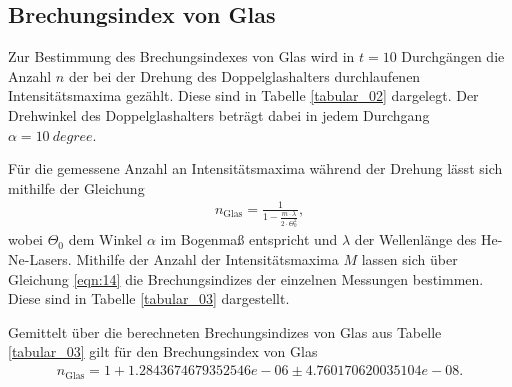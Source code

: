 \subsection{Brechungsindex von Glas}
\noindent Zur Bestimmung des Brechungsindexes von Glas wird in $t = 10$
Durchgängen die Anzahl $n$ der bei der Drehung des Doppelglashalters durchlaufenen
Intensitätsmaxima gezählt. Diese sind in Tabelle \ref{tabular_02} dargelegt.
Der Drehwinkel des Doppelglashalters beträgt dabei in jedem Durchgang $\alpha =
\SI{10}{degree}$. \\
\FloatBarrier

\FloatBarrier
\noindent Für die gemessene Anzahl an Intensitätsmaxima während der Drehung
lässt sich mithilfe der Gleichung
\begin{align}
  n_\text{Glas} = \frac{1}{1 - \frac{m \cdot \lambda}{2 \cdot \Theta_0^2}},
  \label{eqn:14}
\end{align}
\noindent wobei $\Theta_0$ dem Winkel $\alpha$ im Bogenmaß entspricht und
$\lambda$ der Wellenlänge des He-Ne-Lasers. Mithilfe der Anzahl der
Intensitätsmaxima $M$ lassen sich über Gleichung \ref{eqn:14} die
Brechungsindizes der einzelnen Messungen bestimmen. Diese sind in Tabelle
\ref{tabular_03} dargestellt. \\
\FloatBarrier

\FloatBarrier
\noindent Gemittelt über die berechneten Brechungsindizes von Glas aus Tabelle
\ref{tabular_03} gilt für den Brechungsindex von Glas
\begin{align}
  n_\text{Glas} = 1 +  1.2843674679352546e-06  \pm  4.760170620035104e-08.
\end{align}
